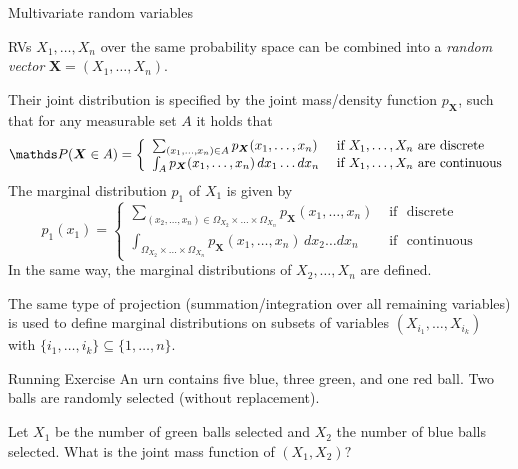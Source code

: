 \begin{frame}[t]{Multivariate random variables}
	
	
	RVs $X_1  , \ldots  , X_n$ over the same probability space can be combined into a \emph{random vector} $\bm{X}=(X_1, \ldots , X_n)$. 
	
	\lz
	
	Their joint distribution is specified by the joint mass/density function $p_{\bm{X}}$, such that for any measurable set $A$ it holds that
	$$ \P(\bm{X}  \in A) =  \left\{ \begin{array}{ll}
		\sum_{  (x_1 , \ldots , x_n) \in A  } p_{\bm{X}}(x_1 , \ldots , x_n) & \text{ if } X_1,\ldots,X_n \text{ are discrete} \\
		\int_{  A}   p_{\bm{X}}(x_1 , \ldots , x_n) \, dx_1\ldots dx_n& \text{ if }  X_1,\ldots,X_n  \text{ are continuous} 
	\end{array} \right.      $$ 
%
	The marginal distribution $p_1$ of $X_1$ is given by
	\[
	p_1(x_1) =  \left\{ \begin{array}{ll}
		\sum_{  (x_2 , \ldots , x_n) \in \Omega_{X_2} \times \ldots \times \Omega_{X_n}  } p_{\bm{X}}(x_1 , \ldots , x_n) & \text{ if } \text{  discrete} \\
		\int_{  \Omega_{X_2} \times \ldots \times \Omega_{X_n} }   p_{\bm{X}}(x_1 , \ldots , x_n) \, dx_2\ldots dx_n& \text{ if }   \text{  continuous} 
	\end{array} \right.     
	\]
%	
	In the same way, the marginal distributions of $X_2, \ldots , X_n$ are defined. 
%	
 
	
	The same type of projection (summation/integration over all remaining variables) is used to define marginal distributions on subsets of variables $(X_{i_1} , \ldots  , X_{i_k})$ with 
	$\{ i_1 ,  \ldots  , i_k \} \subseteq \{1 , \ldots ,  n\}$.
	
	
\end{frame}



\begin{vbframe}{Running Exercise}  
	An urn contains five blue, three green, and one red ball. Two balls are randomly selected (without replacement).
	
	\lz
	
	
	
	Let $X_1$ be the number of green balls selected and $X_2$ the number of blue balls selected. What is the joint mass function of $(X_1,X_2)?$
	
	
	
	
	
\end{vbframe}


